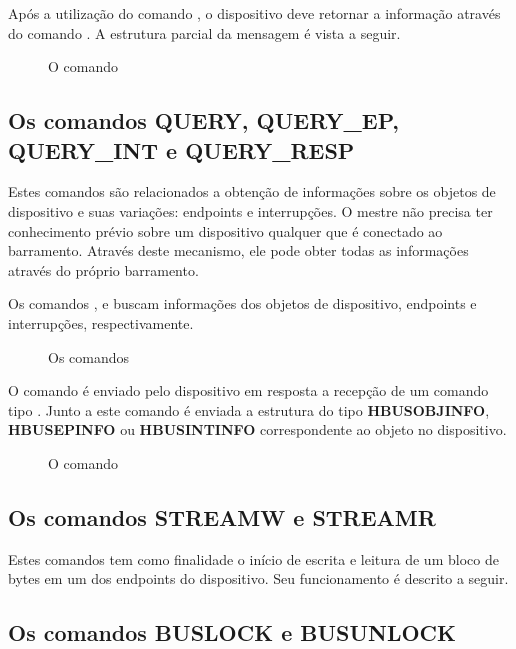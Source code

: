 \documentclass[11pt]{report}
\begin{document}
Após a utilização do comando , o dispositivo deve retornar a informação através do comando .
A estrutura parcial da mensagem é vista a seguir.

\begin{figure}[H]
\centering

\caption{O comando }
\end{figure}

\subsection{Os comandos QUERY, QUERY\_EP, QUERY\_INT e QUERY\_RESP}

Estes comandos são relacionados a obtenção de informações sobre os objetos de dispositivo e suas variações: endpoints e interrupções. O mestre não precisa ter conhecimento prévio sobre um dispositivo qualquer que é conectado ao barramento. Através deste mecanismo, ele pode obter todas as informações através do próprio barramento.

Os comandos ,  e  buscam informações dos objetos de dispositivo, endpoints e interrupções, respectivamente.

\begin{figure}[H]
\centering

\caption{Os comandos }
\end{figure}

O comando  é enviado pelo dispositivo em resposta a recepção de um comando tipo . Junto a este comando é enviada a estrutura do tipo \textbf{HBUSOBJINFO}, \textbf{HBUSEPINFO} ou \textbf{HBUSINTINFO} correspondente ao objeto no dispositivo.

\begin{figure}[H]
\centering

\caption{O comando }
\end{figure}

\subsection{Os comandos STREAMW e STREAMR}

Estes comandos tem como finalidade o início de escrita e leitura de um bloco de bytes em um dos endpoints do dispositivo. Seu funcionamento é descrito a seguir.

\subsection{Os comandos BUSLOCK e BUSUNLOCK}
\end{document}
